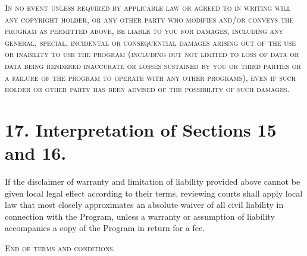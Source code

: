 \documentclass[11pt,a4paper]{article}
\begin{document}
\textsc{In no event unless required by applicable law or agreed to in
writing will any copyright holder, or any other party who modifies
and/or conveys the program as permitted above, be liable to you for
damages, including any general, special, incidental or consequential
damages arising out of the use or inability to use the program
(including but not limited to loss of data or data being rendered
inaccurate or losses sustained by you or third parties or a failure of
the program to operate with any other programs), even if such holder or
other party has been advised of the possibility of such damages.}

\part*{17. Interpretation of Sections 15 and 16.}

If the disclaimer of warranty and limitation of liability provided above
cannot be given local legal effect according to their terms, reviewing
courts shall apply local law that most closely approximates an absolute
waiver of all civil liability in connection with the Program, unless a
warranty or assumption of liability accompanies a copy of the Program in
return for a fee.

\begin{center}
  \textsc{End of terms and conditions.}
\end{center}
\end{document}
